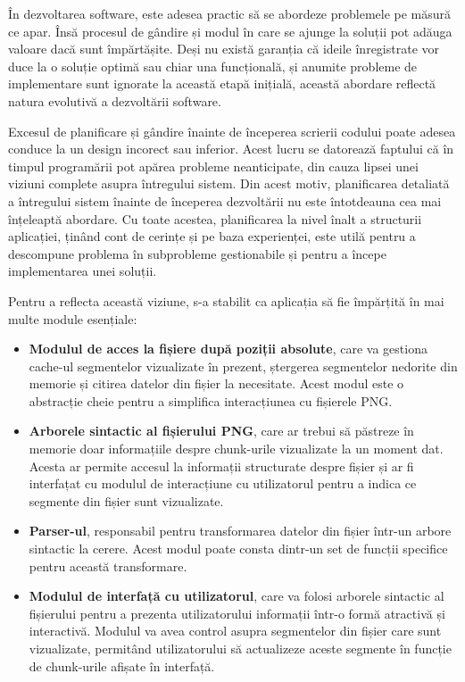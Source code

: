 \documentclass[a4paper,12pt]{report}
\begin{document}
În dezvoltarea software, este adesea practic să se abordeze problemele pe măsură ce apar.
Însă procesul de gândire și modul în care se ajunge la soluții
pot adăuga valoare dacă sunt împărtășite.
Deși nu există garanția că ideile înregistrate vor duce
la o soluție optimă sau chiar una funcțională,
și anumite probleme de implementare sunt ignorate la această etapă inițială,
această abordare reflectă natura evolutivă a dezvoltării software.

Excesul de planificare și gândire înainte de începerea scrierii codului
poate adesea conduce la un design incorect sau inferior.
Acest lucru se datorează faptului că în timpul programării pot apărea probleme neanticipate,
din cauza lipsei unei viziuni complete asupra întregului sistem.
Din acest motiv, planificarea detaliată a întregului sistem înainte de începerea dezvoltării
nu este întotdeauna cea mai înțeleaptă abordare.
Cu toate acestea, planificarea la nivel înalt a structurii aplicației,
ținând cont de cerințe și pe baza experienței,
este utilă pentru a descompune problema în subprobleme gestionabile
și pentru a începe implementarea unei soluții.

Pentru a reflecta această viziune, s-a stabilit ca aplicația
să fie împărțită în mai multe module esențiale:
\begin{itemize}
  \item 
  \textbf{Modulul de acces la fișiere după poziții absolute},
  care va gestiona cache-ul segmentelor vizualizate în prezent,
  ștergerea segmentelor nedorite din memorie și citirea datelor din fișier la necesitate.
  Acest modul este o abstracție cheie pentru a simplifica interacțiunea cu fișierele \ac{PNG}.

  \item
  \textbf{Arborele sintactic al fișierului \ac{PNG}},
  care ar trebui să păstreze în memorie doar informațiile despre
  chunk-urile vizualizate la un moment dat.
  Acesta ar permite accesul la informații structurate despre fișier
  și ar fi interfațat cu modulul de interacțiune cu utilizatorul
  pentru a indica ce segmente din fișier sunt vizualizate.

  \item
  \textbf{Parser-ul}, responsabil pentru transformarea datelor
  din fișier într-un arbore sintactic la cerere.
  Acest modul poate consta dintr-un set de funcții specifice pentru această transformare.

  \item
  \textbf{Modulul de interfață cu utilizatorul},
  care va folosi arborele sintactic al fișierului pentru
  a prezenta utilizatorului informații într-o formă atractivă și interactivă.
  Modulul va avea control asupra segmentelor din fișier care sunt vizualizate,
  permitând utilizatorului să actualizeze aceste segmente
  în funcție de chunk-urile afișate în interfață.
\end{itemize}
\end{document}
